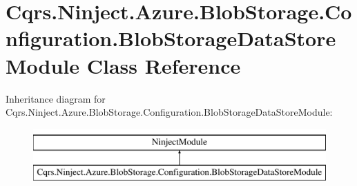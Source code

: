\hypertarget{classCqrs_1_1Ninject_1_1Azure_1_1BlobStorage_1_1Configuration_1_1BlobStorageDataStoreModule}{}\section{Cqrs.\+Ninject.\+Azure.\+Blob\+Storage.\+Configuration.\+Blob\+Storage\+Data\+Store\+Module Class Reference}
\label{classCqrs_1_1Ninject_1_1Azure_1_1BlobStorage_1_1Configuration_1_1BlobStorageDataStoreModule}
Inheritance diagram for Cqrs.\+Ninject.\+Azure.\+Blob\+Storage.\+Configuration.\+Blob\+Storage\+Data\+Store\+Module\+:\begin{figure}[H]
\begin{center}
\leavevmode
\includegraphics[height=2.000000cm]{classCqrs_1_1Ninject_1_1Azure_1_1BlobStorage_1_1Configuration_1_1BlobStorageDataStoreModule}
\end{center}
\end{figure}
